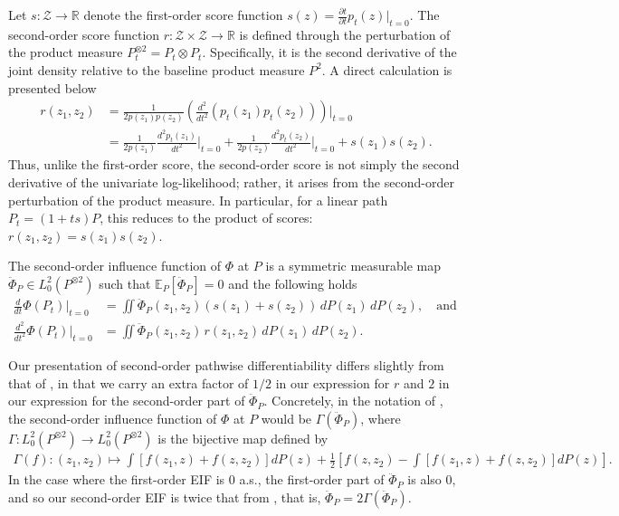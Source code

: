 \documentclass{article}
\theoremstyle{plain}
\theoremstyle{definition}
\theoremstyle{remark}
\newcommand{\R}{\mathbb{R}}
\newcommand{\E}{\mathbb{E}}
\newcommand{\of}[1]{\left(#1\right)}
\newcommand{\cZ}{\mathcal{Z}}
\newcommand{\1}{\mathbbm{1}}
\theoremstyle{plain}
\theoremstyle{definition}
\newcommand{\tand}{\textrm{and }}
\begin{document}
Let $s: \cZ \to \R$ denote the first-order score function $s(z) = \tfrac{\partial t}{\partial t} p_t(z) \big \vert_{t=0}$. The second-order score function \cite{waterman1996projected, small2011hilbert, van2014higher} $r: \cZ \times \cZ \to \R$ is defined through the perturbation of the product measure $P_t^{\otimes 2} = P_t \otimes P_t$. Specifically, it is the second derivative of the joint density relative to the baseline product measure $P^2$.
A direct calculation is presented below
\begin{align*}
    r(z_1, z_2) &= \frac{1}{2 p(z_1) p(z_2)}\of{\frac{d^2}{dt^2} \of{p_t(z_1) p_t(z_2)}} \Big \vert_{t=0}\\
    &= \frac{1}{2p(z_1)} \frac{d^2  p_t(z_1)}{dt^2}\Big \vert_{t=0} + \frac{1}{2p(z_2)} \frac{d^2 p_t(z_2)}{dt^2}\Big \vert_{t=0} + s(z_1) s(z_2).
\end{align*}
Thus, unlike the first-order score, the second-order score is not simply the second derivative of the univariate log-likelihood; rather, it arises from the second-order perturbation of the product measure. In particular, for a linear path $P_t = (1 + ts)P$, this reduces to the product of scores: $r(z_1, z_2) = s(z_1)s(z_2)$. 

The second-order influence function of $\Phi$ at $P$ is a symmetric measurable map $\ddot{\Phi}_P\in L_0^2(P^{\otimes 2})$ such that $\E_P[\ddot{\Phi}_P] = 0$ and the following holds
\begin{align}\label{eq:second-order_IF_conditions}
    \frac{d}{dt} \Phi(P_t) \Big|_{t=0} &= \iint \ddot{\Phi}_P(z_1, z_2) (s(z_1) + s(z_2)) \, dP(z_1) \, dP(z_2), \quad \tand  \nonumber\\
    \frac{d^2}{dt^2} \Phi(P_t) \Big|_{t=0} &= \iint \ddot{\Phi}_P(z_1, z_2) \, r(z_1, z_2)  \, dP(z_1) \,dP(z_2).
\end{align}

Our presentation of second-order pathwise differentiability differs slightly from that of \citet{robins2008higher}, in that we carry an extra factor of $1/2$ in our expression for $r$ and $2$ in our expression for the second-order part of $\ddot{\Phi}_P$. Concretely, in the notation of \citet{robins2008higher}, the second-order influence function of $\Phi$ at $P$ would be $\Gamma(\ddot{\Phi}_P)$, where $\Gamma : L_0^2(P^{\otimes 2})\to L_0^2(P^{\otimes 2})$ is the bijective map defined by
\begin{align*}
    \Gamma(f) : (z_1,z_2)\mapsto \int [f(z_1,z) + f(z,z_2)] dP(z) + \frac{1}{2}\left[f(z,z_2) - \int [f(z_1,z) + f(z,z_2)] dP(z)\right].
\end{align*}
In the case where the first-order EIF is 0 a.s., the first-order part of $\ddot{\Phi}_P$ is also $0$, and so our second-order EIF is twice that from \citet[Def.~2.1]{robins2008higher}, that is, $\ddot{\Phi}_P=2\Gamma(\ddot{\Phi}_P)$.
\end{document}
